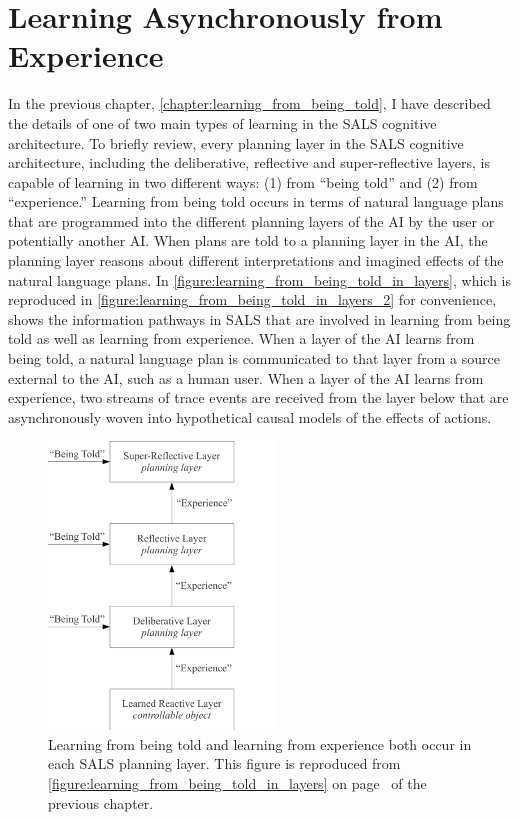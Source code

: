 \chapter{Learning Asynchronously from Experience}
\label{chapter:learning_asynchronously_from_experience}

In the previous chapter,
{\mbox{\autoref{chapter:learning_from_being_told}}}, I have described
the details of one of two main types of learning in the SALS cognitive
architecture.  To briefly review, every planning layer in the SALS
cognitive architecture, including the deliberative, reflective and
super-reflective layers, is capable of learning in two different ways:
(1) from ``being told'' and (2) from ``experience.''  Learning from
being told occurs in terms of natural language plans that are
programmed into the different planning layers of the AI by the user or
potentially another AI.  When plans are told to a planning layer in
the AI, the planning layer reasons about different interpretations and
imagined effects of the natural language plans.  In
{\mbox{\autoref{figure:learning_from_being_told_in_layers}}}, which is
reproduced in
{\mbox{\autoref{figure:learning_from_being_told_in_layers_2}}} for
convenience, shows the information pathways in SALS that are involved
in learning from being told as well as learning from experience.  When
a layer of the AI learns from being told, a natural language plan is
communicated to that layer from a source external to the AI, such as a
human user.  When a layer of the AI learns from experience, two
streams of trace events are received from the layer below that are
asynchronously woven into hypothetical causal models of the effects of
actions.
\begin{figure}
\centering
\includegraphics[width=6cm]{gfx/learning_from_being_told_in_layers}
\caption[Learning from being told and learning from experience both
  occur in each SALS planning layer.  (Reproduced from
  {\mbox{\autoref{figure:learning_from_being_told_in_layers}}})]{Learning
  from being told and learning from experience both occur in each SALS
  planning layer.  This figure is reproduced from
  {\mbox{\autoref{figure:learning_from_being_told_in_layers}}} on
  {\mbox{page~\pageref{figure:learning_from_being_told_in_layers}}} of
  the previous chapter.}
\label{figure:learning_from_being_told_in_layers_2}
\end{figure}

